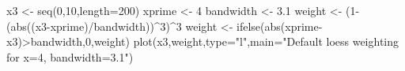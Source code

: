 \begin{Schunk}
\begin{Sinput}
 x3 <- seq(0,10,length=200)
 xprime <- 4
 bandwidth <- 3.1
 weight <- (1- (abs((x3-xprime)/bandwidth))^3)^3
 weight <- ifelse(abs(xprime-x3)>bandwidth,0,weight)
 plot(x3,weight,type="l",main="Default loess weighting for x=4, bandwidth=3.1")
\end{Sinput}
\end{Schunk}
